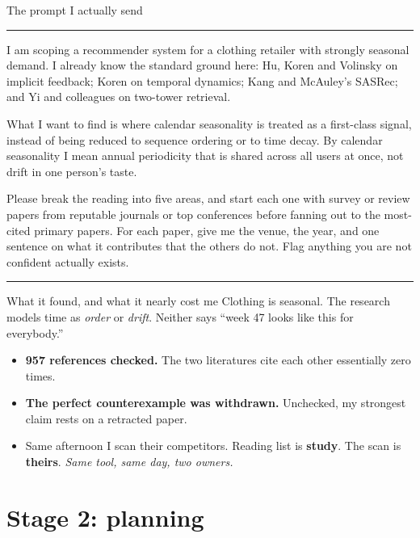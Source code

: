 \documentclass[aspectratio=169,t]{beamer}
\begin{document}
\begin{frame}{The prompt I actually send}
    \vspace{0.5ex}
    \hrule
    \vspace{2ex}
    {\small
    I am scoping a recommender system for a clothing retailer with strongly
    seasonal demand. I already know the standard ground here: Hu, Koren and
    Volinsky on implicit feedback; Koren on temporal dynamics; Kang and
    McAuley's SASRec; and Yi and colleagues on two-tower retrieval.
    \par\medskip
    What I want to find is where calendar seasonality is treated as a
    first-class signal, instead of being reduced to sequence ordering or to time
    decay. By calendar seasonality I mean annual periodicity that is shared
    across all users at once, not drift in one person's taste.
    \par\medskip
    Please break the reading into five areas, and start each one with survey or
    review papers from reputable journals or top conferences before fanning out
    to the most-cited primary papers. For each paper, give me the venue, the
    year, and one sentence on what it contributes that the others do not. Flag
    anything you are not confident actually exists.
    \par}
    \vspace{2ex}
    \hrule
\end{frame}

\begin{frame}{What it found, and what it nearly cost me}
    Clothing is seasonal. The research models time as \emph{order} or
    \emph{drift}. Neither says ``week 47 looks like this for everybody.''
    \begin{itemize}
        \item \textbf{957 references checked.} The two literatures cite each other
              essentially zero times.
        \item \textbf{The perfect counterexample was withdrawn.} Unchecked, my
              strongest claim rests on a retracted paper.
        \item Same afternoon I scan their competitors. Reading list is
              \textbf{study}. The scan is \textbf{theirs}.
              \emph{Same tool, same day, two owners.}
    \end{itemize}
\end{frame}

\section{Stage 2: planning}
\end{document}
